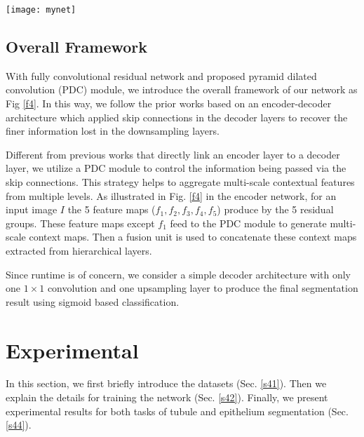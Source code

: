 \documentclass[10pt,twocolumn]{article}
\begin{document}
\begin{figure*}[h]
\centering
\texttt{[image: mynet]}
\caption{Overview of our network framework. A fully convolutional residual network with one $7\times7$ convolution layer and five residual groups is used to compute low and high-level features from the input image. The extracted feature maps ($f_{2},f_{3}, f_{4}, f_{5}$) are then fed to the PDC module to generate multi-level and multi-scale contextual information. Finally, after a concatenation unit, we applied $1\times1$ convolution with a standard 16x bilinear upsampling to build an end-to-end network for pixel-wise dense prediction.
}



\label{f4}
\end{figure*}
\subsection{Overall Framework} \label{s33}
With fully convolutional residual network and proposed pyramid dilated convolution (PDC) module, we introduce the overall framework of our network as Fig \ref{f4}.
In this way, we follow the prior works based on an encoder-decoder architecture \cite{r3,r7,r8} which applied skip connections in the decoder layers to recover the finer information lost in the downsampling layers.

Different from previous works that directly link an encoder layer to a decoder layer, we utilize a PDC module to control the information being passed via the skip connections.
This strategy helps to aggregate multi-scale contextual features from multiple levels. As illustrated in Fig. \ref{f4} in the encoder network, for an input image $I$ the 5 feature maps ($f_{1}, f_{2}, f_{3}, f_{4}, f_{5}$) produce by the 5 residual groups. These feature maps except $f_{1}$ feed to the PDC module to generate multi-scale context maps.
Then a fusion unit is used to concatenate these context maps extracted from hierarchical layers.

Since runtime is of concern, we consider a simple decoder architecture with only one $1\times1$ convolution and one upsampling layer to produce the final segmentation result using sigmoid based classification.

\section{Experimental}\label{s4}
In this section, we first briefly introduce the datasets (Sec. \ref{s41}). Then we explain the details for training the network (Sec. \ref{s42}). Finally, we present experimental results for both tasks of tubule and epithelium segmentation (Sec. \ref{s44}).
\end{document}
